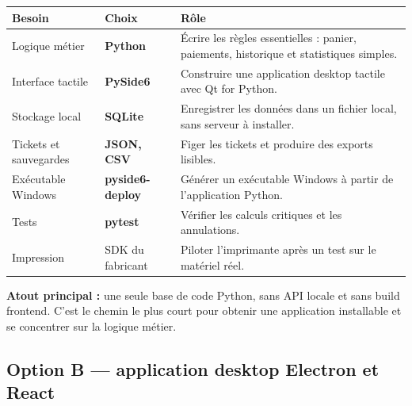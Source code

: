 \documentclass[11pt,a4paper]{article}
\begin{document}
\begin{tabularx}{\textwidth}{L{3.15cm} L{3.15cm} Y}
  \toprule
  \color{white}\textbf{Besoin} &
  \color{white}\textbf{Choix} &
  \color{white}\textbf{Rôle} \\
  \midrule
  Logique métier &
  \textbf{Python} &
  Écrire les règles essentielles : panier, paiements, historique et statistiques simples. \\
  Interface tactile &
  \textbf{PySide6} &
  Construire une application desktop tactile avec Qt for Python. \\
  Stockage local &
  \textbf{SQLite} &
  Enregistrer les données dans un fichier local, sans serveur à installer. \\
  Tickets et sauvegardes &
  \textbf{JSON, CSV} &
  Figer les tickets et produire des exports lisibles. \\
  Exécutable Windows &
  \textbf{pyside6-deploy} &
  Générer un exécutable Windows à partir de l'application Python. \\
  Tests &
  \textbf{pytest} &
  Vérifier les calculs critiques et les annulations. \\
  Impression &
  SDK du fabricant &
  Piloter l'imprimante après un test sur le matériel réel. \\
  \bottomrule
\end{tabularx}

\vspace{3pt}
\textbf{Atout principal :} une seule base de code Python, sans API locale et sans build frontend.
C'est le chemin le plus court pour obtenir une application installable et se concentrer sur la
logique métier.

\subsection{Option B --- application desktop Electron et React}
\end{document}
